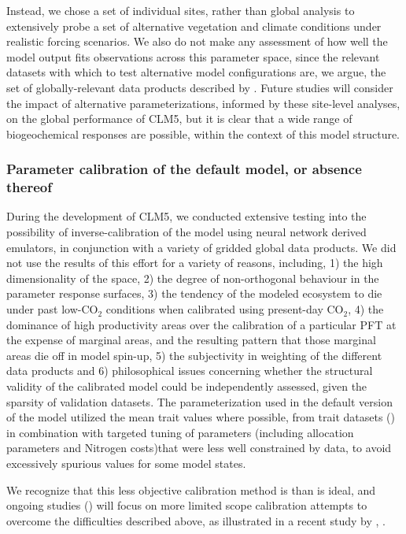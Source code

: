 \documentclass[draft,linenumbers]{agujournal}
\begin{document}
Instead, we chose a set of individual sites, rather than global analysis to extensively probe a set of alternative vegetation and climate conditions under realistic forcing scenarios.  We also do not make any assessment of how well the model output fits observations across this parameter space, since the relevant datasets with which to test alternative model configurations are, we argue, the set of globally-relevant data products described by \cite{lawrence2018}. Future studies will consider the impact of alternative parameterizations, informed by these site-level analyses, on the global performance of CLM5, but it is clear that a wide range of biogeochemical responses are possible, within the context of this model structure.  


\subsubsection{Parameter calibration of the default model, or absence thereof}

During the development of CLM5, we conducted extensive testing into the possibility of inverse-calibration of the model using neural network derived emulators, in conjunction with a variety of gridded global data products. We did not use the results of this effort for a variety of reasons, including,  1) the high dimensionality of the space, 2) the degree of non-orthogonal behaviour in the parameter response surfaces,  3) the tendency of the modeled ecosystem to die under past low-CO$_{2}$ conditions when calibrated using present-day CO$_{2}$, 4) the dominance of high productivity areas over the calibration of a particular PFT at the expense of marginal areas, and the resulting pattern that those marginal areas die off in model spin-up, 5) the subjectivity in weighting of the different data products and 6) philosophical issues concerning whether the structural validity of the calibrated model could be independently assessed, given the sparsity of validation datasets. The parameterization used in the default version of the model utilized the mean trait values where possible, from trait datasets (\cite{lawrence2018}) in combination with targeted tuning of parameters   (including allocation parameters and Nitrogen costs)that were less well constrained by data, to avoid excessively spurious values for some model states.

We recognize that this less objective calibration method is than is ideal, and ongoing studies (\cite{dagon}) will focus on more limited scope calibration attempts to overcome the difficulties described above, as illustrated in a recent study by \cite{fer2018}, .  
\end{document}
